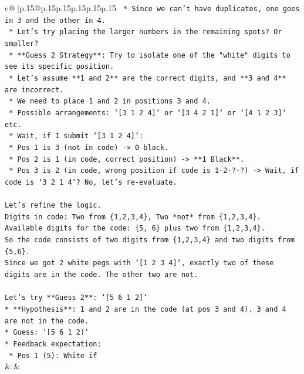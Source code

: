 \documentclass{article}
\begin{document}
{\begin{supertabular}{c@{$\;$}|p{.15\linewidth}@{}p{.15\linewidth}p{.15\linewidth}p{.15\linewidth}p{.15\linewidth}p{.15\linewidth}}
{{{\texttt{    *   Since we can't have duplicates, one goes in 3 and the other in 4.} \\
\texttt{    *   Let's try placing the larger numbers in the remaining spots? Or smaller?} \\
\texttt{    *   **Guess 2 Strategy**: Try to isolate one of the "white" digits to see its specific position.} \\
\texttt{    *   Let's assume **1 and 2** are the correct digits, and **3 and 4** are incorrect.} \\
\texttt{    *   We need to place 1 and 2 in positions 3 and 4.} \\
\texttt{    *   Possible arrangements: `{[}3 1 2 4{]}` or `{[}3 4 2 1{]}` or `{[}4 1 2 3{]}` etc.} \\
\texttt{    *   Wait, if I submit `{[}3 1 2 4{]}`:} \\
\texttt{        *   Pos 1 is 3 (not in code) {-}> 0 black.} \\
\texttt{        *   Pos 2 is 1 (in code, correct position) {-}> **1 Black**.} \\
\texttt{        *   Pos 3 is 2 (in code, wrong position if code is 1{-}2{-}?{-}?) {-}> Wait, if code is `3 2 1 4`? No, let's re{-}evaluate.} \\
\\ 
\texttt{Let's refine the logic.} \\
\texttt{Digits in code: Two from \{1,2,3,4\}, Two *not* from \{1,2,3,4\}.} \\
\texttt{Available digits for the code: \{5, 6\} plus two from \{1,2,3,4\}.} \\
\texttt{So the code consists of two digits from \{1,2,3,4\} and two digits from \{5,6\}.} \\
\texttt{Since we got 2 white pegs with `{[}1 2 3 4{]}`, exactly two of these digits are in the code. The other two are not.} \\
\\ 
\texttt{Let's try **Guess 2**: `{[}5 6 1 2{]}`} \\
\texttt{*   **Hypothesis**: 1 and 2 are in the code (at pos 3 and 4). 3 and 4 are not in the code.} \\
\texttt{*   Guess: `{[}5 6 1 2{]}`} \\
\texttt{*   Feedback expectation:} \\
\texttt{    *   Pos 1 (5): White if} \\
            }
        }
    }
    & & \\ \\


\end{supertabular}}
\end{document}
